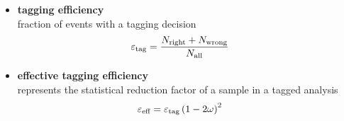 {\begin{itemize}
\item \textbf{tagging efficiency} \\[0.04cm] 
fraction of events with a tagging decision
\begin{equation*}
\hspace{-1.6em}
\varepsilon_\text{tag}=\frac{N_{\text{right}}+N_{\text{wrong}}}{N_{\text{all}}}
\end{equation*}
\vspace{-1.1em}
\item \textbf{effective tagging efficiency} \\[0.04cm] 
represents the statistical reduction factor of a sample in a tagged analysis
\vspace{-0.3em}
\begin{equation*}
\hspace{-1.6em}
\vspace{0.5em}
\varepsilon_\text{eff}=\varepsilon_\text{tag}\left(1-2\omega\right)^2
\end{equation*}
\end{itemize}


}
